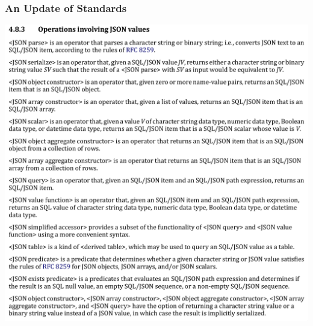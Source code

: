 \begin{frame}
\frametitle{An Update of Standards}

\centering
\includegraphics[height=0.9\textheight,frame]{sql2023.png}
\end{frame}

